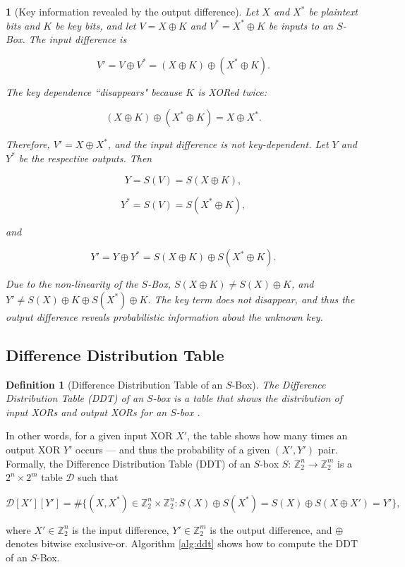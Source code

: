 \documentclass{report}
\newtheorem{definition}{Definition}{\bfseries}{\itshape}
\newtheorem*{concept}{}{\bfseries}{\itshape}
\begin{document}
\begin{concept}[Key information revealed by the output difference]
Let $X$ and $X^*$ be plaintext bits and $K$ be key bits, and let $V = X \oplus K$ and $V^* = X^* \oplus K$ be inputs to an $S$-Box. The input difference is

$$
V' = V \oplus V^* = (X \oplus K) \oplus (X^* \oplus K).
$$

The key dependence ``disappears" because $K$ is XORed twice:

$$
(X \oplus K) \oplus (X^* \oplus K) = X \oplus X^*.
$$

Therefore, $V' = X \oplus X^*$, and \emph{the input difference is not key-dependent}. Let $Y$ and $Y^*$ be the respective outputs. Then

$$
Y = S(V) = S(X \oplus K),
$$

$$
Y^* = S(V) = S(X^* \oplus K),
$$

and

$$
Y' = Y \oplus Y^* = S(X \oplus K) \oplus S(X^* \oplus K).
$$

Due to the non-linearity of the $S$-Box, $S(X \oplus K) \neq S(X) \oplus K$, and $Y' \neq S(X) \oplus K \oplus S(X^*) \oplus K$. The key term does not disappear, and thus \emph{the output difference reveals probabilistic information about the unknown key}.
\end{concept}

\subsection{Difference Distribution Table}

\begin{definition}[Difference Distribution Table of an $S$-Box]\label{def:ddt}
The Difference Distribution Table (DDT) of an $S$-box is a table that shows the distribution of input XORs and output XORs for an $S$-box \cite{Shamir}.
\end{definition}

In other words, for a given input XOR $X'$, the table shows how many times an output XOR $Y'$ occurs --- and thus the probability of a given $(X', Y')$ pair. Formally, the Difference Distribution Table (DDT) of an $S$-box $S$: $\mathbb{Z}_2^n \rightarrow \mathbb{Z}_2^m$ is a $2^n \times 2^m$ table $\mathcal{D}$ such that

$$
\mathcal{D}[X'][Y'] = \#\{(X,X^*) \in \mathbb{Z}_2^n \times \mathbb{Z}_2^n: S(X) \oplus S(X^*) = S(X) \oplus S(X \oplus X') = Y'\},
$$

where $X' \in \mathbb{Z}_2^n$  is the input difference, $Y' \in \mathbb{Z}_2^m$ is the output difference, and $\oplus$ denotes bitwise exclusive-or. Algorithm \ref{alg:ddt} shows how to compute the DDT of an $S$-Box.
\end{document}
